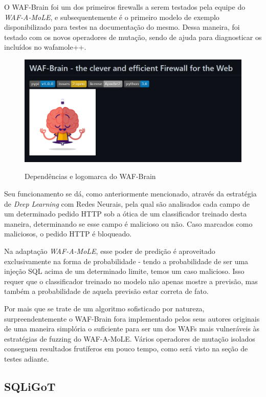 O WAF-Brain \cite{waf_brain} foi um dos primeiros firewalls a serem testados pela equipe do \textit{WAF-A-MoLE}, e subsequentemente é o primeiro modelo de exemplo disponibilizado para testes na documentação do mesmo. Dessa maneira, foi testado com os novos operadores de mutação, sendo de ajuda para diagnosticar os incluídos no wafamole++.

\begin{figure}[ht]
    \centering
    \caption{Dependências e logomarca do WAF-Brain}
    \includegraphics[width=12.5cm]{figuras/WAFBrain.png} 
    \label{fig:internet} 
\end{figure}

Seu funcionamento se dá, como anteriormente mencionado, através da estratégia de \textit{Deep Learning} com Redes Neurais, pela qual são analisados cada campo de um determinado pedido HTTP sob a ótica de um classificador treinado desta maneira, determinando se esse campo é malicioso ou não. Caso marcados como maliciosos, o pedido HTTP é bloqueado.

Na adaptação \textit{WAF-A-MoLE}, esse poder de predição é aproveitado exclusivamente na forma de probabilidade - tendo a probabilidade de ser uma injeção SQL acima de um determinado limite, temos um caso malicioso. Isso requer que o classificador treinado no modelo não apenas mostre a previsão, mas também a probabilidade de aquela previsão estar correta de fato.

Por mais que se trate de um algoritmo sofisticado por natureza, surpreendentemente o WAF-Brain fora implementado pelos seus autores originais de uma maneira simplória o suficiente para ser um dos WAFs mais vulneráveis às estratégias de fuzzing do WAF-A-MoLE. Vários operadores de mutação isolados conseguem resultados frutíferos em pouco tempo, como será visto na seção de testes adiante.

\subsection{SQLiGoT}

